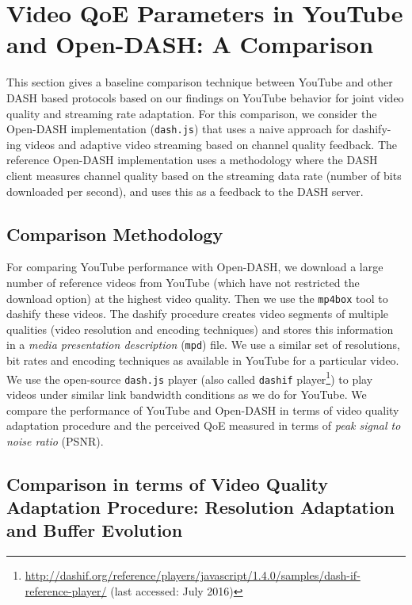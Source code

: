 \section{Video QoE Parameters in YouTube and Open-DASH: A Comparison}
\label{sec:open-dash}

This section gives a baseline comparison technique between YouTube and other DASH based protocols based on our findings on YouTube behavior for joint video quality and streaming rate adaptation. For this comparison, we consider the Open-DASH implementation (\texttt{dash.js}) that uses a naive approach for dashify-ing videos and adaptive video streaming based on channel quality feedback. The reference Open-DASH implementation uses a methodology where the DASH client measures channel quality based on the streaming data rate (number of bits downloaded per second), and uses this as a feedback to the DASH server.

\subsection{Comparison Methodology}

For comparing YouTube performance with Open-DASH, we download a large number of reference videos from YouTube (which have not restricted the download option) at the highest video quality. Then we use the \texttt{mp4box} tool to dashify these videos. The dashify procedure creates video segments of multiple qualities (video resolution and encoding techniques) and stores this information in a \textit{media presentation description} (\texttt{mpd}) file. We use a similar set of resolutions, bit rates and encoding techniques as available in YouTube for a particular video. We use the open-source \texttt{dash.js} player (also called \texttt{dashif} player\footnote{\url{http://dashif.org/reference/players/javascript/1.4.0/samples/dash-if-reference-player/} (last accessed: July 2016)}) to play videos under similar link bandwidth conditions as we do for YouTube. We compare the performance of YouTube and Open-DASH in terms of video quality adaptation procedure and the perceived QoE measured in terms of \textit{peak signal to noise ratio} (PSNR). 

\subsection{Comparison in terms of Video Quality Adaptation Procedure: Resolution Adaptation and Buffer Evolution}

